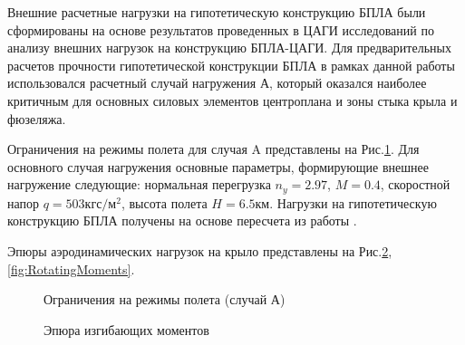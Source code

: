 Внешние расчетные нагрузки на гипотетическую конструкцию БПЛА были сформированы на основе результатов проведенных в ЦАГИ исследований \cite{BPS_TSAGI} по анализу внешних нагрузок на конструкцию БПЛА-ЦАГИ. Для предварительных расчетов прочности гипотетической конструкции БПЛА в рамках данной работы использовался расчетный случай нагружения А, который оказался наиболее критичным для основных силовых элементов центроплана и зоны стыка крыла и фюзеляжа. 



Ограничения на режимы полета для случая A представлены на Рис.\ref{fig:ModeOfFlight}. Для основного случая нагружения основные параметры, формирующие внешнее нагружение следующие: нормальная перегрузка $n_y = 2.97$, $M = 0.4$, скоростной напор $q = 503 \text{кгс}/\text{м}^2$, высота полета $H = 6.5\text{км}$. Нагрузки на гипотетическую конструкцию БПЛА получены на основе пересчета из работы \cite{BPS}.

Эпюры аэродинамических нагрузок на крыло представлены на Рис.\ref{fig:BendingMoments},\ref{fig:RotatingMoments}.





\begin{figure}[H]
\centering
\def\svgwidth{0.9\textwidth}

\caption{Ограничения на режимы полета (случай А)}
\label{fig:ModeOfFlight}
\end{figure}


\begin{figure}[H]
\centering
\def\svgwidth{0.9\textwidth}

\caption{Эпюра изгибающих моментов}
\label{fig:BendingMoments}
\end{figure}


%

%

